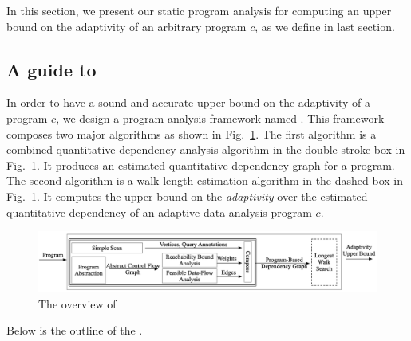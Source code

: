 In this section, we present our static program analysis for computing an upper bound on the adaptivity of an arbitrary program $c$, as we define in last section. 
%
\subsection{A guide to {\THESYSTEM} }
In order to have a sound and accurate upper bound on the  adaptivity of a program $c$,
we design a program analysis framework named {\THESYSTEM}.
This framework composes two major algorithms as shown in Fig.~\ref{fig:adaptfun}.
The first algorithm is a combined quantitative dependency analysis algorithm in the double-stroke box in Fig.~\ref{fig:adaptfun}.
It produces an estimated quantitative dependency graph for a program.
The second algorithm is a walk length estimation algorithm in the dashed box in Fig.~\ref{fig:adaptfun}.
It computes the upper bound on the \emph{adaptivity} over the estimated quantitative dependency of an adaptive data analysis program $c$.
\begin{figure}
  \centering    
\includegraphics[width=1.0\columnwidth]{adapfun.png}
  \vspace{-0.3cm}
  \caption{The overview of {\THESYSTEM}}
  \label{fig:adaptfun}
  \vspace{-0.5cm}
\end{figure}
%
Below is the outline of the {\THESYSTEM}.
